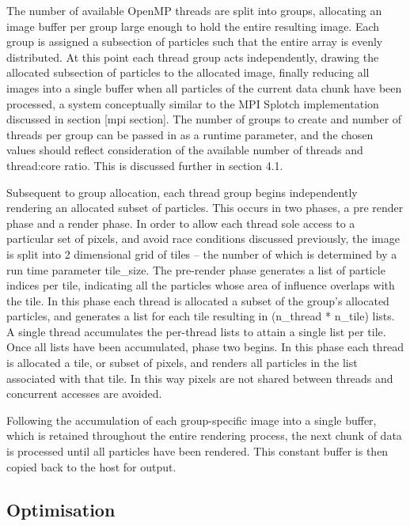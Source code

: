 \documentclass{easychair}
\begin{document}
The number of available OpenMP threads are split into groups, allocating an image buffer per group large enough to hold 
the entire resulting image. Each group is assigned a subsection of particles such that the entire array is evenly distributed. 
At this point each thread group acts independently, drawing the allocated subsection of particles to the allocated image, finally 
reducing all images into a single buffer when all particles of the current data chunk have been processed, a system 
conceptually similar to the MPI Splotch implementation discussed in section [mpi section]. The number of groups to create and 
number of threads per group can be passed in as a runtime parameter, and the chosen values should reflect consideration 
of the available number of threads and thread:core ratio. This is discussed further in section 4.1.

Subsequent to group allocation, each thread group begins independently rendering an allocated subset of particles. This 
occurs in two phases, a pre render phase and a render phase. In order to allow each thread sole access to a particular 
set of pixels, and avoid race conditions discussed previously, the image is split into 2 dimensional grid of tiles – 
the number of which is determined by a run time parameter tile\_size. The pre-render phase generates a list of particle 
indices per tile, indicating all the particles whose area of influence overlaps with the tile. In this phase each thread 
is allocated a subset of the group's allocated particles, and generates a list for each tile resulting in 
(n\_thread * n\_tile) lists. A single thread accumulates the per-thread lists to attain a single list per tile. 
Once all lists have been accumulated, phase two begins. In this phase each thread is allocated a tile, or subset of 
pixels, and renders all particles in the list associated with that tile. In this way pixels are not shared between 
threads and concurrent accesses are avoided.

Following the accumulation of each group-specific image into a single buffer, which is retained throughout the entire 
rendering process, the next chunk of data is processed until all particles have been rendered. This constant buffer is 
then copied back to the host for output. 



\subsection{Optimisation}
\label{sect:micoptimisation}
\end{document}

